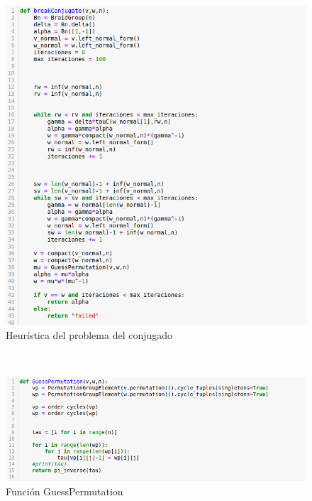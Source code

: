 \documentclass[12pt]{book}
\theoremstyle{definition}
\begin{document}
\begin{figure}[h!]
\centering
\includegraphics[scale=0.5]{imgs/breakConjugate.png} 
\caption{Heurística del problema del conjugado}
\label{img:alg_a}
\end{figure}
\ 
\newline
\newline
\begin{figure}[h!]
\centering
\includegraphics[scale=0.5]{imgs/GuessPermutation.png} 
\caption{Función GuessPermutation}
\label{img:guess_per}
\end{figure}

\ 
\newpage
\ 
\newpage
\ 
\newpage
\end{document}
